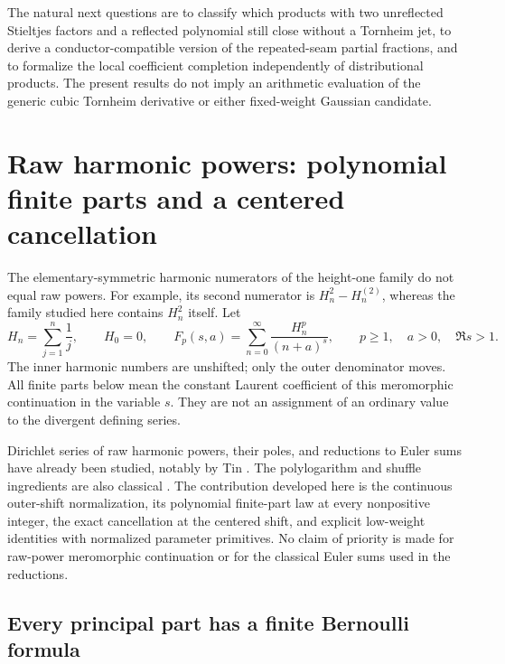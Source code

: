 \documentclass[11pt,a4paper]{article}
\numberwithin{equation}{section}
\theoremstyle{definition}
\theoremstyle{remark}
\begin{document}
The natural next questions are to classify which products with two
unreflected Stieltjes factors and a reflected polynomial still close
without a Tornheim jet, to derive a conductor-compatible version of the
repeated-seam partial fractions, and to formalize the local coefficient
completion independently of distributional products. The present
results do not imply an arithmetic evaluation of the generic cubic
Tornheim derivative or either fixed-weight Gaussian candidate.



\section{Raw harmonic powers: polynomial finite parts and a centered cancellation}
\label{hp:sec:main}

The elementary-symmetric harmonic numerators of the height-one family do
not equal raw powers. For example, its second numerator is
$H_n^2-H_n^{(2)}$, whereas the family studied here contains $H_n^2$ itself.
Let
\begin{equation}\label{hp:def:F}
 H_n=\sum_{j=1}^n\frac1j,\qquad H_0=0,\qquad
 F_p(s,a)=\sum_{n=0}^{\infty}\frac{H_n^p}{(n+a)^s},
 \qquad p\ge1,\quad a>0,\quad \Re s>1.
\end{equation}
The inner harmonic numbers are unshifted; only the outer denominator
moves. All finite parts below mean the constant Laurent coefficient of
this meromorphic continuation in the variable $s$. They are not an
assignment of an ordinary value to the divergent defining series.

Dirichlet series of raw harmonic powers, their poles, and reductions to
Euler sums have already been studied, notably by Tin
\cite{hp:Tin2025}. The polylogarithm and shuffle ingredients are also
classical \cite{hp:IKZ2006}. The contribution developed here is the
continuous outer-shift normalization, its polynomial finite-part law at
every nonpositive integer, the exact cancellation at the centered shift,
and explicit low-weight identities with normalized parameter primitives.
No claim of priority is made for raw-power meromorphic continuation or
for the classical Euler sums used in the reductions.

\subsection{Every principal part has a finite Bernoulli formula}
\end{document}
